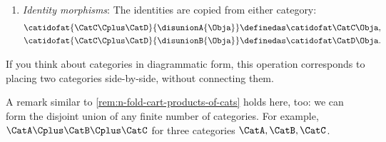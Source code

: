 \begin{ctdefinition}
\begin{enumerate}
        \item \emph{Identity morphisms}: The identities  are copied from either category:
              \begin{align}
                  \catidofat{\CatC\Cplus\CatD}{\disunionA{\Obja}} & \definedas \catidofat\CatC\Obja, \\
                  \catidofat{\CatC\Cplus\CatD}{\disunionB{\Obja}} & \definedas \catidofat\CatD\Obja.
              \end{align}
    \end{enumerate}
\end{ctdefinition}

\begin{remark}
    If you think about categories in diagrammatic form, this operation corresponds to placing two categories side-by-side, without connecting them.
\end{remark}

\begin{remark}
A remark similar to \cref{rem:n-fold-cart-products-of-cats} holds here, too: we can form the disjoint union of any finite number of categories. For example, $\CatA \Cplus \CatB \Cplus \CatC$ for three categories $\CatA, \CatB, \CatC$. 
\end{remark}

